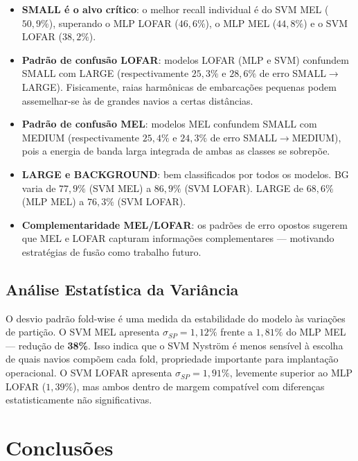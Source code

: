 \documentclass[a4paper,12pt]{article}
\begin{document}
\begin{itemize}
    \item \textbf{SMALL é o alvo crítico}: o melhor recall individual é do SVM MEL ($50{,}9\%$), superando o MLP LOFAR ($46{,}6\%$), o MLP MEL ($44{,}8\%$) e o SVM LOFAR ($38{,}2\%$).

    \item \textbf{Padrão de confusão LOFAR}: modelos LOFAR (MLP e SVM) confundem SMALL com LARGE (respectivamente $25{,}3\%$ e $28{,}6\%$ de erro SMALL$\to$LARGE). Fisicamente, raias harmônicas de embarcações pequenas podem assemelhar-se às de grandes navios a certas distâncias.

    \item \textbf{Padrão de confusão MEL}: modelos MEL confundem SMALL com MEDIUM (respectivamente $25{,}4\%$ e $24{,}3\%$ de erro SMALL$\to$MEDIUM), pois a energia de banda larga integrada de ambas as classes se sobrepõe.

    \item \textbf{LARGE e BACKGROUND}: bem classificados por todos os modelos. BG varia de $77{,}9\%$ (SVM MEL) a $86{,}9\%$ (SVM LOFAR). LARGE de $68{,}6\%$ (MLP MEL) a $76{,}3\%$ (SVM LOFAR).

    \item \textbf{Complementaridade MEL/LOFAR}: os padrões de erro opostos sugerem que MEL e LOFAR capturam informações complementares — motivando estratégias de fusão como trabalho futuro.
\end{itemize}

\subsection{Análise Estatística da Variância}

O desvio padrão fold-wise é uma medida da estabilidade do modelo às variações de partição. O SVM MEL apresenta $\sigma_{SP} = 1{,}12\%$ frente a $1{,}81\%$ do MLP MEL — redução de \textbf{38\%}. Isso indica que o SVM Nyström é menos sensível à escolha de quais navios compõem cada fold, propriedade importante para implantação operacional. O SVM LOFAR apresenta $\sigma_{SP} = 1{,}91\%$, levemente superior ao MLP LOFAR ($1{,}39\%$), mas ambos dentro de margem compatível com diferenças estatisticamente não significativas.

\section{Conclusões}
\end{document}
